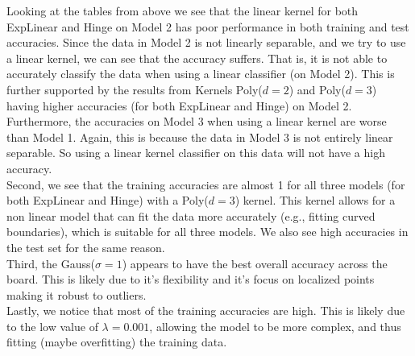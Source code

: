 \documentclass[12pt]{article}
\begin{document}
\begin{enumerate}[(a)]
  Looking at the tables from above we see that the linear kernel for both ExpLinear and Hinge on Model 2 has poor performance in both training and test accuracies. Since the data in Model 2 is not linearly separable, and we try to use a linear kernel, we can see that the accuracy suffers. That is, it is not able to accurately classify the data when using a linear classifier (on Model 2). This is further supported by the results from Kernels Poly($d=2$) and Poly($d = 3$) having higher accuracies (for both ExpLinear and Hinge) on Model 2. Furthermore, the accuracies on Model 3 when using a linear kernel are worse than Model 1. Again, this is because the data in Model 3 is not entirely linear separable. So using a linear kernel classifier on this data will not have a high accuracy.\\
  Second, we see that the training accuracies are almost 1 for all three models (for both ExpLinear and Hinge) with a Poly($d=3$) kernel. This kernel allows for a non linear model that can fit the data more accurately (e.g., fitting curved boundaries), which is suitable for all three models. We also see high accuracies in the test set for the same reason. \\
  Third, the Gauss($\sigma = 1$) appears to have the best overall accuracy across the board. This is likely due to it's flexibility and it's focus on localized points making it robust to outliers.\\
  Lastly, we notice that most of the training accuracies are high. This is likely due to the low value of $\lambda = 0.001$, allowing the model to be more complex, and thus fitting (maybe overfitting) the training data.
\end{enumerate}
\end{document}
